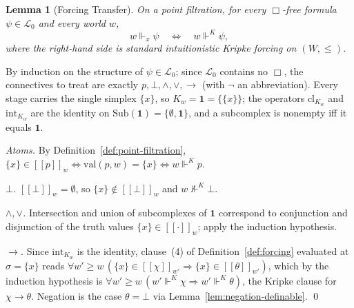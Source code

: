 \documentclass[final,12pt]{elsarticle}
\newcommand{\llbracket}{[\![}
\newcommand{\rrbracket}{]\!]}
\theoremstyle{plain}
\newtheorem{lem}[thm]{Lemma}
\theoremstyle{definition}
\begin{document}
\begin{lem}[Forcing Transfer]
\label{lem:forcing-transfer}
On a point filtration, for every \(\Box\)-free formula \(\psi\in\mathcal{L}_0\)
and every world \(w\),
\[
  w \Vdash_x \psi \quad\Longleftrightarrow\quad w \Vdash^{K} \psi ,
\]
where the right-hand side is standard intuitionistic Kripke forcing on
\((W,\le)\).
\end{lem}

\proof
By induction on the structure of \(\psi\in\mathcal{L}_0\); since \(\mathcal{L}_0\)
contains no \(\Box\), the connectives to treat are exactly
\(p,\bot,\wedge,\vee,\to\) (with \(\neg\) an abbreviation). Every stage carries the
single simplex \(\{x\}\), so \(K_w=\mathbf 1=\{\{x\}\}\); the operators
\(\mathrm{cl}_{K_w}\) and \(\mathrm{int}_{K_w}\) are the identity on
\(\mathrm{Sub}(\mathbf 1)=\{\emptyset,\mathbf 1\}\), and a subcomplex is nonempty
iff it equals \(\mathbf 1\).

\emph{Atoms.} By Definition~\ref{def:point-filtration},
\(\{x\}\in\llbracket p\rrbracket_w\iff \mathrm{val}(p,w)=\{x\}\iff w\Vdash^{K}p\).

\emph{\(\bot\).} \(\llbracket\bot\rrbracket_w=\emptyset\), so
\(\{x\}\notin\llbracket\bot\rrbracket_w\) and \(w\nVdash^{K}\bot\).

\emph{\(\wedge,\vee\).} Intersection and union of subcomplexes of \(\mathbf 1\)
correspond to conjunction and disjunction of the truth values
\(\{x\}\in\llbracket\cdot\rrbracket_w\); apply the induction hypothesis.

\emph{\(\to\).} Since \(\mathrm{int}_{K_w}\) is the identity, clause~(4) of
Definition~\ref{def:forcing} evaluated at \(\sigma=\{x\}\) reads
\(\forall w'\ge w\,(\{x\}\in\llbracket\chi\rrbracket_{w'}\Rightarrow
\{x\}\in\llbracket\theta\rrbracket_{w'})\), which by the induction hypothesis is
\(\forall w'\ge w\,(w'\Vdash^{K}\chi\Rightarrow w'\Vdash^{K}\theta)\), the Kripke
clause for \(\chi\to\theta\). Negation is the case \(\theta=\bot\) via
Lemma~\ref{lem:negation-definable}.
\qed
\end{document}
